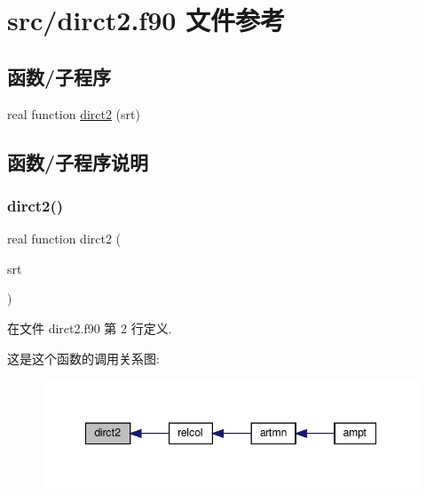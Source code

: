 \hypertarget{dirct2_8f90}{}\section{src/dirct2.f90 文件参考}
\label{dirct2_8f90}
\subsection*{函数/子程序}
\begin{DoxyCompactItemize}
\item 
real function \mbox{\hyperlink{dirct2_8f90_aaadddecdf4549f7a84b1f9d1558a3b8a}{dirct2}} (srt)
\end{DoxyCompactItemize}


\subsection{函数/子程序说明}
\mbox{\label{dirct2_8f90_aaadddecdf4549f7a84b1f9d1558a3b8a}} 
\subsubsection{\texorpdfstring{dirct2()}{dirct2()}}
{\footnotesize\ttfamily real function dirct2 (\begin{DoxyParamCaption}\item[{}]{srt }\end{DoxyParamCaption})}



在文件 dirct2.\+f90 第 2 行定义.

这是这个函数的调用关系图\+:
\nopagebreak
\begin{figure}[H]
\begin{center}
\leavevmode
\includegraphics[width=348pt]{dirct2_8f90_aaadddecdf4549f7a84b1f9d1558a3b8a_icgraph}
\end{center}
\end{figure}
